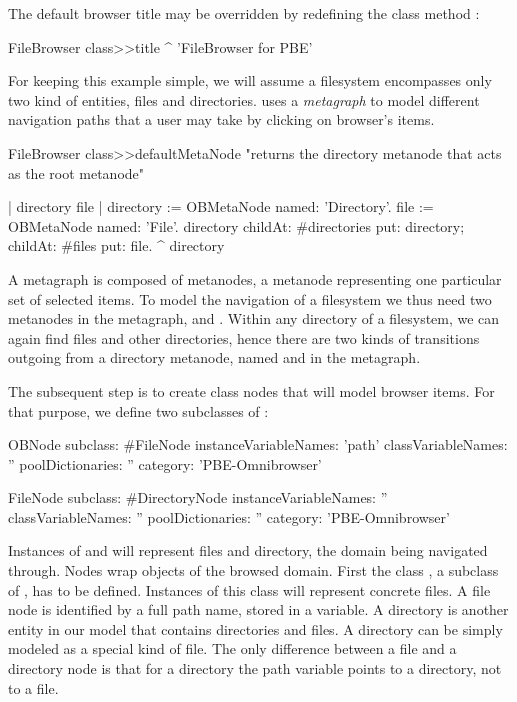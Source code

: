 \documentclass[a4paper,10pt,twoside]{book}
\begin{document}
The default browser title may be overridden by redefining the class method :

\begin{code}{}
FileBrowser class>>title
	^ 'FileBrowser for PBE'
\end{code}


For keeping this example simple, we will assume a filesystem encompasses only two kind of entities, files and directories. 
\ob uses a \emph{metagraph} to model different navigation paths that a user may take by clicking on browser's items. 

\begin{code}{}
FileBrowser class>>defaultMetaNode
     "returns the directory metanode that acts as the root metanode"
 
     | directory file |
     directory := OBMetaNode named: 'Directory'.
     file := OBMetaNode named: 'File'.
     directory 
          childAt: #directories put: directory;
          childAt: #files put: file.
     ^ directory
\end{code}

A metagraph is composed of metanodes, a metanode representing one particular set of selected items.
To model the navigation of a filesystem we thus need two metanodes in the metagraph,  and . Within any directory of a filesystem, we can again find files and other directories, hence there are two kinds of transitions outgoing from a directory metanode, named  and  in the metagraph. 

The subsequent step is to create class nodes that will model browser items. For that purpose, we define two subclasses of :

\begin{code}{}
OBNode subclass: #FileNode
	instanceVariableNames: 'path'
	classVariableNames: ''
	poolDictionaries: ''
	category: 'PBE-Omnibrowser'

FileNode subclass: #DirectoryNode
	instanceVariableNames: ''
	classVariableNames: ''
	poolDictionaries: ''
	category: 'PBE-Omnibrowser'
\end{code}

Instances of  and  will represent files and directory, the domain being navigated through. 
Nodes wrap objects of the browsed domain. First the class , a subclass of , has to be defined. Instances of this class will represent concrete files. A file node is identified by a full path name, stored in a variable. A directory is another entity in our model that contains directories and files. A directory can be simply modeled as a special kind of file. The only difference between a file and a directory node is that for a directory the path variable points to a directory, not to a file. 
\end{document}
